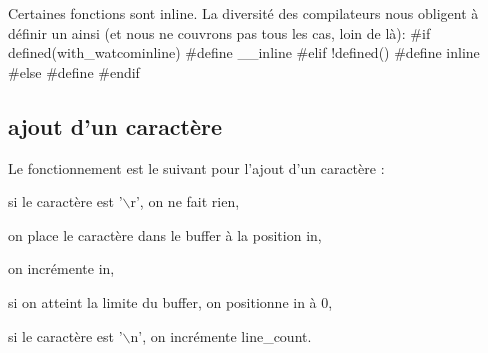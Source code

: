 \documentclass{scrartcl}%
\begin{document}
\eatline
{}\nwendcode{}Certaines fonctions sont {\Tt{}inline\nwendquote}. La diversité des compilateurs nous obligent à définir un {\Tt{}\nwendquote} ainsi (et nous ne couvrons pas tous les cas, loin de là):
\nwenddocs{}\endmoddef\nwstartdeflinemarkup{}\nwenddeflinemarkup
#if defined(with_watcominline)
        #define  __inline
#elif !defined()
        #define  inline
#else
        #define 
#endif
\eatline
{}\nwendcode{}\subsection{ajout d'un caractère}
Le fonctionnement est le suivant pour l'ajout d'un caractère :

\begin{packed_itemize}
  \item si le caractère est '$\backslash$r', on ne fait rien,
  \item on place le caractère dans le buffer à la position {\Tt{}in\nwendquote},
  \item on incrémente {\Tt{}in\nwendquote},
  \item si on atteint la limite du buffer, on positionne {\Tt{}in\nwendquote} à 0,
  \item si le caractère est '$\backslash$n', on incrémente {\Tt{}line{\_}count\nwendquote}.
\end{packed_itemize}
\end{document}
